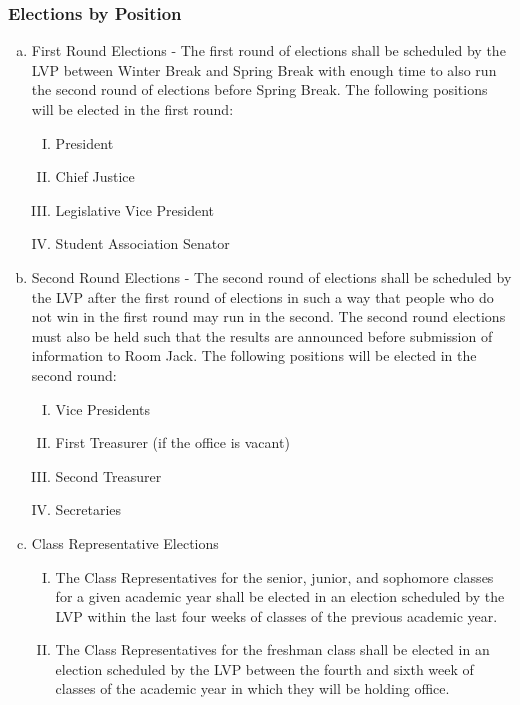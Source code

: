 \documentclass[USletter,12pt]{article}
\begin{document}
\subsubsection{Elections by Position}
\begin{enumerate}[(a)]
\item First Round Elections - The first round of elections shall be scheduled by the LVP between Winter Break and Spring Break with enough time to also run the second round of elections before Spring Break.  The following positions will be elected in the first round:
	\begin{enumerate}[(I)]
	\item President
	\item Chief Justice
	\item Legislative Vice President
	\item Student Association Senator
	\end{enumerate}
\item Second Round Elections - The second round of elections shall be scheduled by the LVP after the first round of elections in such a way that people who do not win in the first round may run in the second.  The second round elections must also be held such that the results are announced before submission of information to Room Jack.  The following positions will be elected in the second round:
	\begin{enumerate}[(I)]
	\item Vice Presidents
	\item First Treasurer (if the office is vacant)
	\item Second Treasurer
	\item Secretaries
	\end{enumerate}
\item Class Representative Elections
	\begin{enumerate}[(I)]
	\item The Class Representatives for the senior, junior, and sophomore classes for a given academic year shall be elected in an election scheduled by the LVP within the last four weeks of classes of the previous academic year.
	\item The Class Representatives for the freshman class shall be elected in an election scheduled by the LVP between the fourth and sixth week of classes of the academic year in which they will be holding office.
	\end{enumerate}
\end{enumerate}
\end{document}
